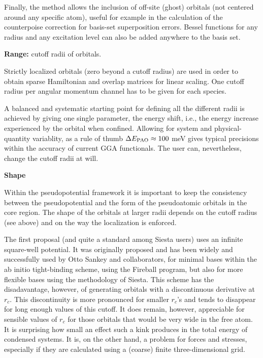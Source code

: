\documentclass[11pt]{article}
\begin{document}
Finally, the method allows the inclusion of off-site (ghost) orbitals
(not centered around any specific atom), useful for example in the
calculation of the counterpoise correction for basis-set superposition
errors.  Bessel functions for any radius and any excitation level can
also be added anywhere to the basis set.

{\bf Range:} cutoff radii of orbitals.

Strictly localized orbitals (zero beyond a cutoff radius) are used in
order to obtain sparse Hamiltonian and overlap matrices for linear
scaling. One cutoff radius per angular momentum channel has to be
given for each species.

A balanced and systematic starting point for defining all the
different radii is achieved by giving one single parameter, the energy
shift, i.e., the energy increase experienced by the orbital when confined.
Allowing for system and physical-quantity variablity, as a rule of
thumb $\Delta E_{\small \rm PAO} \approx 100$ meV gives typical
precisions within the accuracy of current GGA functionals.  The user
can, nevertheless, change the cutoff radii at will.

{\bf Shape}

Within the pseudopotential framework it is important to keep the
consistency between the pseudopotential and the form of the
pseudoatomic orbitals in the core region.  The shape of the orbitals
at larger radii depends on the cutoff radius (see above) and on the
way the localization is enforced.

The first proposal (and quite a standard among {\sc Siesta} users)
uses an infinite square-well potential.  It was originally proposed
and has been widely and successfully used by Otto Sankey and
collaborators, for minimal bases within the ab initio tight-binding
scheme, using the {\sc Fireball } program, but also for more flexible
bases using the methodology of {\sc Siesta}.  This scheme has the
disadavantage, however, of generating orbitals with a discontinuous
derivative at $r_c$.  This discontinuity is more pronounced for
smaller $r_c$'s and tends to disappear for long enough values of this
cutoff.  It does remain, however, appreciable for sensible values of
$r_c$ for those orbitals that would be very wide in the free atom.  It
is surprising how small an effect such a kink produces in the total
energy of condensed systems.  It is, on the other hand, a problem for
forces and stresses, especially if they are calculated using a
(coarse) finite three-dimensional grid.
\end{document}
